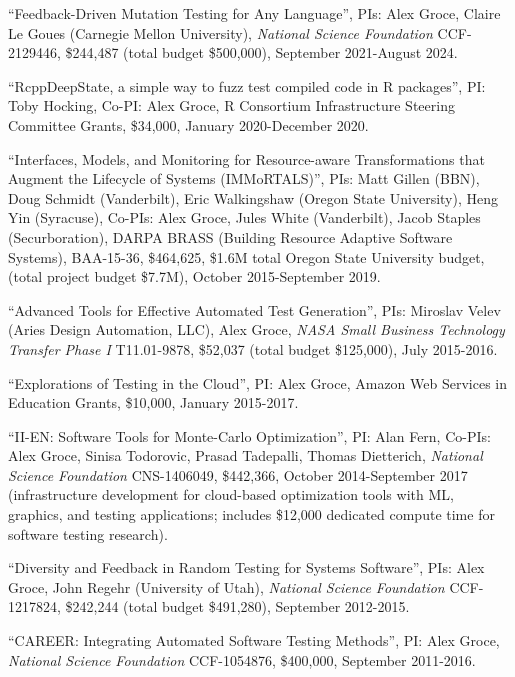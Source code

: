 \documentclass[ComputerScience]{vita}
\begin{document}
\begin{vita}
\begin{Funding}
\item ``Feedback-Driven Mutation Testing for Any Language'', PIs: Alex Groce, Claire Le Goues (Carnegie Mellon University), \emph{National Science Foundation} CCF-2129446, \$244,487 (total budget \$500,000), September 2021-August 2024.
\item ``{RcppDeepState}, a simple way to fuzz test compiled code in {R} packages'', PI: Toby Hocking, Co-PI: Alex Groce, R Consortium Infrastructure Steering Committee Grants, \$34,000, January 2020-December 2020.
\item ``Interfaces, Models, and Monitoring for Resource-aware Transformations that Augment the Lifecycle of Systems (IMMoRTALS)'', PIs: Matt Gillen (BBN), Doug Schmidt (Vanderbilt), Eric Walkingshaw (Oregon State University), Heng Yin (Syracuse), Co-PIs: Alex Groce, Jules White (Vanderbilt), Jacob Staples (Securboration), DARPA BRASS (Building Resource Adaptive Software Systems), BAA-15-36, \$464,625, \$1.6M total Oregon State University budget, (total project budget \$7.7M), October 2015-September 2019.
\item ``Advanced Tools for Effective Automated Test Generation'', PIs: Miroslav Velev (Aries Design Automation, LLC), Alex Groce, \emph{NASA Small Business Technology Transfer Phase I} T11.01-9878, \$52,037 (total budget \$125,000), July 2015-2016.
\item ``Explorations of Testing in the Cloud'', PI: Alex Groce, Amazon Web Services in Education Grants, \$10,000, January 2015-2017.
\item ``II-EN: Software Tools for Monte-Carlo Optimization'', PI: Alan Fern, Co-PIs: Alex Groce, Sinisa Todorovic, Prasad Tadepalli, Thomas Dietterich, \emph{National Science Foundation} CNS-1406049, \$442,366, October 2014-September 2017 (infrastructure development for cloud-based optimization tools with ML, graphics, and testing applications; includes \$12,000 dedicated compute time for software testing research).
\item ``Diversity and Feedback in Random Testing for Systems Software'', PIs: Alex Groce, John Regehr (University of Utah), \emph{National Science Foundation} CCF-1217824, \$242,244 (total budget \$491,280), September 2012-2015.
\item ``CAREER: Integrating Automated Software Testing Methods'', PI: Alex Groce, \emph{National Science Foundation} CCF-1054876, \$400,000, September 2011-2016.
\end{Funding}


\end{vita}
\end{document}
